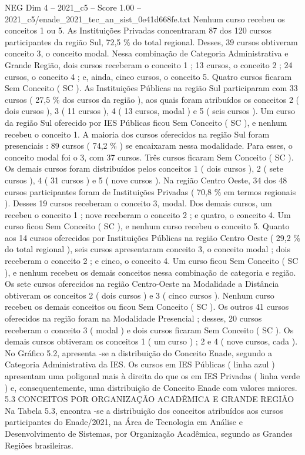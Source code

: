 \begin{textsample}{NEG Dim 4 – 2021\_c5 – Score 1.00 – 2021\_c5/enade\_2021\_tec\_an\_sist\_0e41d668fe.txt}
Nenhum curso recebeu os conceitos 1 ou 5.
As Instituições Privadas concentraram 87 dos 120 cursos participantes da região Sul, 72,5 \% do total regional.
Desses, 39 cursos obtiveram conceito 3, o conceito modal.
Nessa combinação de Categoria Administrativa e Grande Região, dois cursos receberam o conceito 1 ; 13 cursos, o conceito 2 ; 24 cursos, o conceito 4 ; e, ainda, cinco cursos, o conceito 5.
Quatro cursos ficaram Sem Conceito ( SC ).
As Instituições Públicas na região Sul participaram com 33 cursos ( 27,5 \% dos cursos da região ), aos quais foram atribuídos os conceitos 2 ( dois cursos ), 3 ( 11 cursos ), 4 ( 13 cursos, modal ) e 5 ( seis cursos ).
Um curso da região Sul oferecido por IES Públicas ficou Sem Conceito ( SC ), e nenhum recebeu o conceito 1.
A maioria dos cursos oferecidos na região Sul foram presenciais : 89 cursos ( 74,2 \% ) se encaixaram nessa modalidade.
Para esses, o conceito modal foi o 3, com 37 cursos.
Três cursos ficaram Sem Conceito ( SC ).
Os demais cursos foram distribuídos pelos conceitos 1 ( dois cursos ), 2 ( sete cursos ), 4 ( 31 cursos ) e 5 ( nove cursos ).
Na região Centro Oeste, 34 dos 48 cursos participantes foram de Instituições Privadas ( 70,8 \% em termos regionais ).
Desses 19 cursos receberam o conceito 3, modal.
Dos demais cursos, um recebeu o conceito 1 ; nove receberam o conceito 2 ; e quatro, o conceito 4.
Um curso ficou Sem Conceito ( SC ), e nenhum curso recebeu o conceito 5.
Quanto aos 14 cursos oferecidos por Instituições Públicas na região Centro Oeste ( 29,2 \% do total regional ), seis cursos apresentaram conceito 3, o conceito modal ; dois receberam o conceito 2 ; e cinco, o conceito 4.
Um curso ficou Sem Conceito ( SC ), e nenhum recebeu os demais conceitos nessa combinação de categoria e região.
Os sete cursos oferecidos na região Centro-Oeste na Modalidade a Distância obtiveram os conceitos 2 ( dois cursos ) e 3 ( cinco cursos ).
Nenhum curso recebeu os demais conceitos ou ficou Sem Conceito ( SC ).
Os outros 41 cursos oferecidos na região foram na Modalidade Presencial ; desses, 20 cursos receberam o conceito 3 ( modal ) e dois cursos ficaram Sem Conceito ( SC ).
Os demais cursos obtiveram os conceitos 1 ( um curso ) ; 2 e 4 ( nove cursos, cada ).
No Gráfico 5.2, apresenta -se a distribuição do Conceito Enade, segundo a Categoria Administrativa da IES.
Os cursos em IES Públicas ( linha azul ) apresentam uma poligonal mais à direita do que os em IES Privadas ( linha verde ) e, consequentemente, uma distribuição de Conceito Enade com valores maiores. 5.3 CONCEITOS POR ORGANIZAÇÃO ACADÊMICA E GRANDE REGIÃO Na Tabela 5.3, encontra -se a distribuição dos conceitos atribuídos aos cursos participantes do Enade/2021, na Área de Tecnologia em Análise e Desenvolvimento de Sistemas, por Organização Acadêmica, segundo as Grandes Regiões brasileiras.

\end{textsample}
